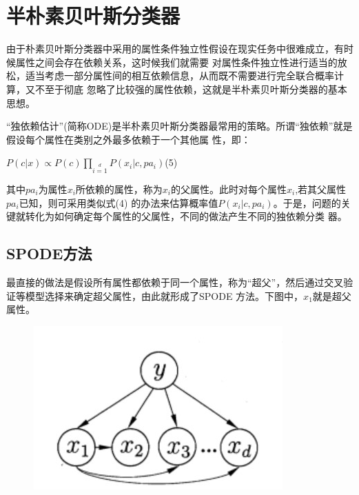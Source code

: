 \documentclass[UTF8]{ctexart}
\begin{document}
{\section{半朴素贝叶斯分类器}
由于朴素贝叶斯分类器中采用的属性条件独立性假设在现实任务中很难成立，有时候属性之间会存在依赖关系，这时候我们就需要
对属性条件独立性进行适当的放松，适当考虑一部分属性间的相互依赖信息，从而既不需要进行完全联合概率计算，又不至于彻底
忽略了比较强的属性依赖，这就是半朴素贝叶斯分类器的基本思想。\par
“独依赖估计”(简称ODE)是半朴素贝叶斯分类器最常用的策略。所谓“独依赖”就是假设每个属性在类别之外最多依赖于一个其他属
性，即：
\begin{center}
    \LARGE{
        $P(c|x)\propto P(c)\prod\limits_{i=1}\limits^dP(x_i|c,pa_i)$\quad(5)
    }
\end{center}
其中$pa_i$为属性$x_i$所依赖的属性，称为$x_i$的父属性。此时对每个属性$x_i$,若其父属性$pa_i$已知，则可采用类似式(4)
的办法来估算概率值$P(x_i|c,pa_i)$。于是，问题的关键就转化为如何确定每个属性的父属性，不同的做法产生不同的独依赖分类
器。\par
\subsection{SPODE方法}
最直接的做法是假设所有属性都依赖于同一个属性，称为“超父”，然后通过交叉验证等模型选择来确定超父属性，由此就形成了SPODE
方法。下图中，$x_1$就是超父属性。
\begin{figure}[ht]
    \centering
    \includegraphics[scale=0.6]{04.jpg}
\end{figure}
}
\end{document}
